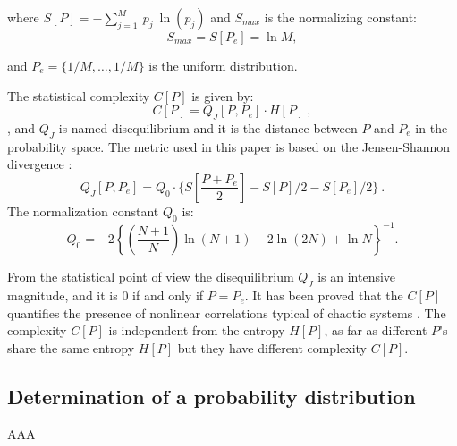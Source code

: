 \noindent where $S[P]=-\sum _{j=1}^{M}~p_j~\ln( p_j )$ and $S_{max}$ is the normalizing constant:%
%
\begin{equation}
\label{eq:Smax} S_{max}= S[P_e] = \ln M,
\end{equation}

\noindent and $P_e=\{ 1/M, \dots,1/M\}$ is the uniform distribution.

The statistical complexity $C[P]$ is given by:
\begin{equation}
\label{eq:inten}
C[{P}]=Q_{J}[{P,P_e}]\cdot H[{P}] \ ,
\end{equation}
, and
$Q_{J}$ is named disequilibrium and it is the distance between $P$ and $P_e$ in the probability space.
The metric used in this paper is based on the Jensen-Shannon divergence \cite{Lamberti2004}:%
%
\begin{equation}
\label{eq:disequi}
Q_{J}[{P,P_e}]= Q_0 \cdot \{S[\frac{P+P_e}{2}]-S[P]/2-S[P_e]/2 \} \ .
\end{equation}
%
\noindent The normalization constant $Q_0$ is:
\begin{equation}
\label{eq:q0j}
Q_0=-2 \left\{ \left( \frac{N+1}{N} \right) \ln(N+1) - 2 \ln(2N) + \ln N \right\}^{-1} .
\end{equation}

From the statistical point of view the disequilibrium $Q_J$ is an intensive magnitude, and it is $0$ if and only if $P=P_e$.
It has been proved that the $C[P]$ quantifies the presence of nonlinear correlations typical of chaotic systems \cite{Martin2003,Lamberti2004}.
The complexity $C[P]$ is independent from the entropy $H[P]$, as far as different $P$'s share the same entropy $H[P]$ but they have different complexity $C[P]$.

\subsection{Determination of a probability distribution}

AAA

